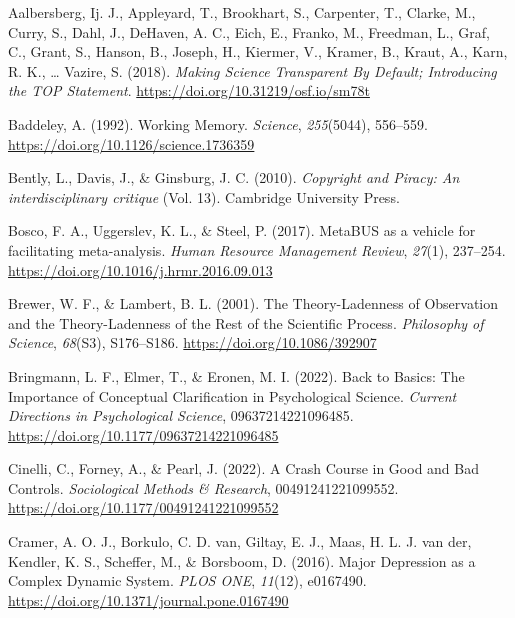 \documentclass[
  man, noextraspace,floatsintext]{apa7}
\newlength{\cslhangindent}
\newenvironment{CSLReferences}[2] %
 {\begin{list}{}{%
  \setlength{\itemindent}{0pt}
  \setlength{\leftmargin}{0pt}
  \setlength{\parsep}{0pt}
  \ifodd #1
   \setlength{\leftmargin}{\cslhangindent}
   \setlength{\itemindent}{-1\cslhangindent}
  \fi
  \setlength{\itemsep}{#2\baselineskip}}}
 {\end{list}}
\begin{document}
\label{refs}
\begin{CSLReferences}{1}{0}
Aalbersberg, Ij. J., Appleyard, T., Brookhart, S., Carpenter, T., Clarke, M., Curry, S., Dahl, J., DeHaven, A. C., Eich, E., Franko, M., Freedman, L., Graf, C., Grant, S., Hanson, B., Joseph, H., Kiermer, V., Kramer, B., Kraut, A., Karn, R. K., \ldots{} Vazire, S. (2018). \emph{Making {Science Transparent By Default}; {Introducing} the {TOP Statement}}. \url{https://doi.org/10.31219/osf.io/sm78t}

Baddeley, A. (1992). Working {Memory}. \emph{Science}, \emph{255}(5044), 556--559. \url{https://doi.org/10.1126/science.1736359}

Bently, L., Davis, J., \& Ginsburg, J. C. (2010). \emph{Copyright and {Piracy}: {An} interdisciplinary critique} (Vol. 13). Cambridge University Press.

Bosco, F. A., Uggerslev, K. L., \& Steel, P. (2017). {MetaBUS} as a vehicle for facilitating meta-analysis. \emph{Human Resource Management Review}, \emph{27}(1), 237--254. \url{https://doi.org/10.1016/j.hrmr.2016.09.013}

Brewer, W. F., \& Lambert, B. L. (2001). The {Theory-Ladenness} of {Observation} and the {Theory-Ladenness} of the {Rest} of the {Scientific Process}. \emph{Philosophy of Science}, \emph{68}(S3), S176--S186. \url{https://doi.org/10.1086/392907}

Bringmann, L. F., Elmer, T., \& Eronen, M. I. (2022). Back to {Basics}: {The Importance} of {Conceptual Clarification} in {Psychological Science}. \emph{Current Directions in Psychological Science}, 09637214221096485. \url{https://doi.org/10.1177/09637214221096485}

Cinelli, C., Forney, A., \& Pearl, J. (2022). A {Crash Course} in {Good} and {Bad Controls}. \emph{Sociological Methods \& Research}, 00491241221099552. \url{https://doi.org/10.1177/00491241221099552}

Cramer, A. O. J., Borkulo, C. D. van, Giltay, E. J., Maas, H. L. J. van der, Kendler, K. S., Scheffer, M., \& Borsboom, D. (2016). Major {Depression} as a {Complex Dynamic System}. \emph{PLOS ONE}, \emph{11}(12), e0167490. \url{https://doi.org/10.1371/journal.pone.0167490}


\end{CSLReferences}
\end{document}
